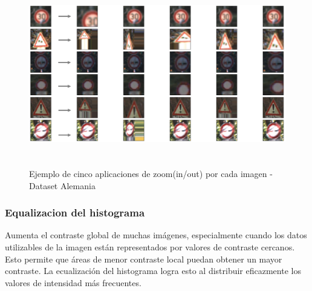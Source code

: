 			\begin{figure}[H]
				\begin{center}
				\includegraphics[width=1\textwidth,height=8cm]{images/desarrollo/Augment/zoom_inv}
				\end{center}
				\begin{center}
				\vspace{0.5em}
				\caption{\small{Ejemplo de cinco aplicaciones de zoom(in/out) por cada imagen - Dataset Alemania}}
				{\small{\fontsize{10}{16.8}\selectfont {Fuente: Elaboración propia}}}
				\end{center}
				\vspace{-1.5em}
			\end{figure}


		\subsubsection{Equalizacion del histograma}
			Aumenta el contraste global de muchas imágenes, especialmente cuando los datos utilizables de la imagen están representados por valores de contraste cercanos. Esto permite que áreas de menor contraste local puedan obtener un mayor contraste. La ecualización del histograma logra esto al distribuir eficazmente los valores de intensidad más frecuentes.

